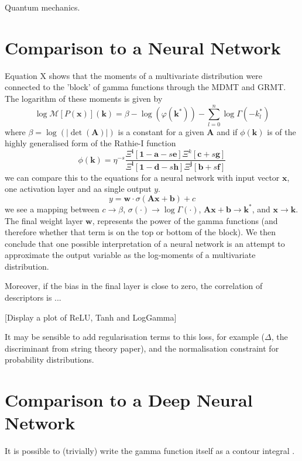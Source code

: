 \documentclass{article}
\begin{document}
Quantum mechanics.


\section{Comparison to a Neural Network}
Equation X shows that the moments of a multivariate distribution were connected to the 'block' of gamma functions through the MDMT and GRMT. The logarithm of these moments is given by
\begin{equation}
\log \mathcal{M}[P(\mathbf{x})](\mathbf{k}) = \beta - \log(\varphi(\mathbf{k}^*)) - \sum_{l=0}^n \log\Gamma(-k_l^*)
\end{equation}
where $\beta = \log(|\det(\mathbf{A})|)$ is a constant for a given $\mathbf{A}$ and if $\phi(\mathbf{k})$ is of the highly generalised form of the Rathie-I function
\begin{equation}
\phi(\mathbf{k}) =  \eta^{-s}\frac{\Xi^{\mathbf{i}}[\mathbf{1-a}-s\mathbf{e}]\Xi^{k}[\mathbf{c}+s\mathbf{g}]}{\Xi^{\mathbf{l}}[\mathbf{1-d}-s\mathbf{h}] \Xi^{\mathbf{j}}[\mathbf{b} + s \mathbf{f}]}
\end{equation}
we can compare this to the equations for a neural network with input vector $\mathbf{x}$, one activation layer and aa single output $y$.
\begin{equation}
y = \mathbf{w}\cdot\sigma(\mathbf{Ax} + \mathbf{b}) + c
\end{equation}
we see a mapping between $c \to \beta$, $\sigma(\cdot) \to \log\Gamma(\cdot)$, $\mathbf{Ax + b} \to \mathbf{k}^*$, and $\mathbf{x} \to \mathbf{k}$. The final weight layer $\mathbf{w}$, represents the power of the gamma functions (and therefore whether that term is on the top or bottom of the block). We then conclude that one possible interpretation of a neural network is an attempt to approximate the output variable as the log-moments of a multivariate distribution.

Moreover, if the bias in the final layer is close to zero, the correlation of descriptors is ...

[Display a plot of ReLU, Tanh and LogGamma]

It may be sensible to add regularisation terms to this loss, for example ({\color{red}$\Delta$, the discriminant from string theory paper}), and the normalisation constraint for probability distributions.

\section{Comparison to a Deep Neural Network}
It is possible to (trivially) write the gamma function itself as a contour integral \citep{Rathie2013}. 
\end{document}
